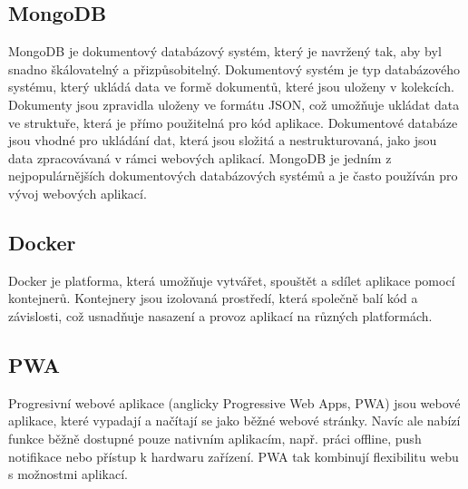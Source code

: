 \subsection{MongoDB}\label{mongo}
MongoDB je dokumentový databázový systém, který je navržený tak, aby byl snadno škálovatelný a přizpůsobitelný. Dokumentový systém je typ databázového systému, který ukládá data ve formě dokumentů, které jsou uloženy v kolekcích. Dokumenty jsou zpravidla uloženy ve formátu JSON, což umožňuje ukládat data ve struktuře, která je přímo použitelná pro kód aplikace. Dokumentové databáze jsou vhodné pro ukládání dat, která jsou složitá a nestrukturovaná, jako jsou data zpracovávaná v rámci webových aplikací. MongoDB je jedním z nejpopulárnějších dokumentových databázových systémů a je často používán pro vývoj webových aplikací.

\subsection{Docker}
Docker je platforma, která umožňuje vytvářet, spouštět a sdílet aplikace pomocí kontejnerů. Kontejnery jsou izolovaná prostředí, která společně balí kód a závislosti, což usnadňuje nasazení a provoz aplikací na různých platformách. \cite{docker}

\subsection{PWA}\label{pwa}
Progresivní webové aplikace (anglicky Progressive Web Apps, PWA) jsou webové aplikace, které vypadají a načítají se jako běžné webové stránky. Navíc ale nabízí funkce běžně dostupné pouze nativním aplikacím, např. práci offline, push notifikace nebo přístup k hardwaru zařízení. PWA tak kombinují flexibilitu webu s možnostmi aplikací. \cite{pwa}